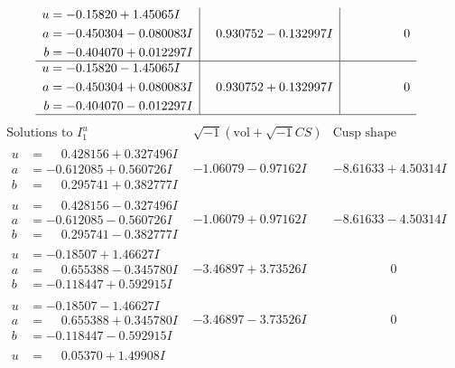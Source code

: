\documentclass[1p]{elsarticle_modified}
\theoremstyle{definition}
\newcommand{\I}{\sqrt{-1}}
\begin{document}
$$\begin{array}{c|c|c}
\begin{aligned}
u &= -0.15820 + 1.45065 I \\
a &= -0.450304 - 0.080083 I \\
b &= -0.404070 + 0.012297 I\end{aligned}
 & \phantom{-}0.930752 - 0.132997 I & \phantom{-0.000000 } 0 \\ \hline\begin{aligned}
u &= -0.15820 - 1.45065 I \\
a &= -0.450304 + 0.080083 I \\
b &= -0.404070 - 0.012297 I\end{aligned}
 & \phantom{-}0.930752 + 0.132997 I & \phantom{-0.000000 } 0\\
 \hline 
 \end{array}$$\newpage$$\begin{array}{c|c|c}  
\text{Solutions to }I^u_{1}& \I (\text{vol} + \sqrt{-1}CS) & \text{Cusp shape}\\
 \hline 
\begin{aligned}
u &= \phantom{-}0.428156 + 0.327496 I \\
a &= -0.612085 + 0.560726 I \\
b &= \phantom{-}0.295741 + 0.382777 I\end{aligned}
 & -1.06079 - 0.97162 I & -8.61633 + 4.50314 I \\ \hline\begin{aligned}
u &= \phantom{-}0.428156 - 0.327496 I \\
a &= -0.612085 - 0.560726 I \\
b &= \phantom{-}0.295741 - 0.382777 I\end{aligned}
 & -1.06079 + 0.97162 I & -8.61633 - 4.50314 I \\ \hline\begin{aligned}
u &= -0.18507 + 1.46627 I \\
a &= \phantom{-}0.655388 - 0.345780 I \\
b &= -0.118447 + 0.592915 I\end{aligned}
 & -3.46897 + 3.73526 I & \phantom{-0.000000 } 0 \\ \hline\begin{aligned}
u &= -0.18507 - 1.46627 I \\
a &= \phantom{-}0.655388 + 0.345780 I \\
b &= -0.118447 - 0.592915 I\end{aligned}
 & -3.46897 - 3.73526 I & \phantom{-0.000000 } 0 \\ \hline\begin{aligned}
u &= \phantom{-}0.05370 + 1.49908 I \\

\end{aligned}
\end{array}$$
\end{document}
